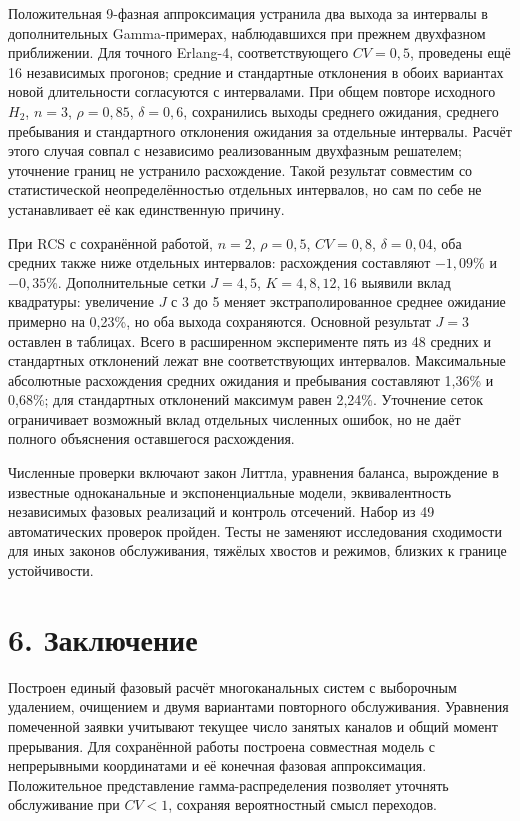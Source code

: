 Положительная 9-фазная аппроксимация устранила два выхода за интервалы в дополнительных Gamma-примерах, наблюдавшихся при прежнем двухфазном приближении. Для точного Erlang-4, соответствующего \(CV=0{,}5\), проведены ещё 16 независимых прогонов; средние и стандартные отклонения в обоих вариантах новой длительности согласуются с интервалами. При общем повторе исходного \(H_2\), \(n=3\), \(\rho=0{,}85\), \(\delta=0{,}6\), сохранились выходы среднего ожидания, среднего пребывания и стандартного отклонения ожидания за отдельные интервалы. Расчёт этого случая совпал с независимо реализованным двухфазным решателем; уточнение границ не устранило расхождение. Такой результат совместим со статистической неопределённостью отдельных интервалов, но сам по себе не устанавливает её как единственную причину.

При RCS с сохранённой работой, \(n=2\), \(\rho=0{,}5\), \(CV=0{,}8\), \(\delta=0{,}04\), оба средних также ниже отдельных интервалов: расхождения составляют \(-1{,}09\%\) и \(-0{,}35\%\). Дополнительные сетки \(J=4,5\), \(K=4,8,12,16\) выявили вклад квадратуры: увеличение \(J\) с 3 до 5 меняет экстраполированное среднее ожидание примерно на 0{,}23\%, но оба выхода сохраняются. Основной результат \(J=3\) оставлен в таблицах. Всего в расширенном эксперименте пять из 48 средних и стандартных отклонений лежат вне соответствующих интервалов. Максимальные абсолютные расхождения средних ожидания и пребывания составляют 1{,}36\% и 0{,}68\%; для стандартных отклонений максимум равен 2{,}24\%. Уточнение сеток ограничивает возможный вклад отдельных численных ошибок, но не даёт полного объяснения оставшегося расхождения.

Численные проверки включают закон Литтла, уравнения баланса, вырождение в известные одноканальные и экспоненциальные модели, эквивалентность независимых фазовых реализаций и контроль отсечений. Набор из 49 автоматических проверок пройден. Тесты не заменяют исследования сходимости для иных законов обслуживания, тяжёлых хвостов и режимов, близких к границе устойчивости.

\section*{6. Заключение}
Построен единый фазовый расчёт многоканальных систем с выборочным удалением, очищением и двумя вариантами повторного обслуживания. Уравнения помеченной заявки учитывают текущее число занятых каналов и общий момент прерывания. Для сохранённой работы построена совместная модель с непрерывными координатами и её конечная фазовая аппроксимация. Положительное представление гамма-распределения позволяет уточнять обслуживание при \(CV<1\), сохраняя вероятностный смысл переходов.

